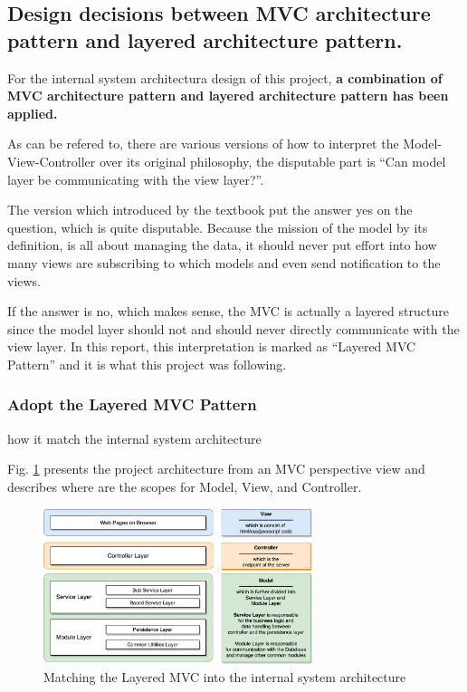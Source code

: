 \documentclass[conference]{IEEEtran}
\begin{document}
\subsection{Design decisions between MVC architecture pattern and layered architecture pattern.}
\label{sec:1.3}


For the internal system architectura design of this project,
\textbf{a combination of MVC architecture pattern and layered architecture pattern has been applied.}

As can be refered to\cite{mvc_versions}, there are various versions of how to interpret the Model-View-Controller over its original philosophy,
the disputable part is \textquotedblleft Can model layer be communicating with the view layer?\textquotedblright .

The version which introduced by the textbook\cite{textbook} put the answer yes on the question, which is quite disputable.
Because the mission of the model by its definition, is all about managing the data,
it should never put effort into how many views are subscribing to which models and even send notification to the views.

If the answer is no, which makes sense, the MVC is actually a layered structure\cite{mvc_2,mvc_3}
since the model layer should not and should never directly communicate with the view layer.
In this report, this interpretation is marked as \textquotedblleft Layered MVC Pattern\textquotedblright
and it is what this project was following.

\subsubsection{\textbf{Adopt the Layered MVC Pattern}} how it match the internal system architecture

Fig. \ref{fig:mvc-arch} presents the project architecture from an MVC perspective view
and describes where are the scopes for Model, View, and Controller.

\begin{figure}[!ht]
	\centering
	\includegraphics[width=0.7\textwidth]{mvc-arch.png}
	\caption{Matching the Layered MVC into the internal system architecture}
	\label{fig:mvc-arch}
\end{figure}
\end{document}
